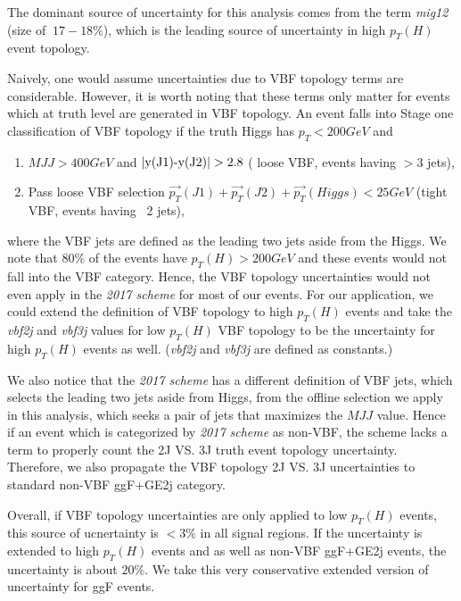 The dominant source of uncertainty for this analysis comes from the term \textit{mig12} (size of $~17-18\%$), 
which is the leading source of uncertainty in high $p_T(H)$ event topology. 

Naively, one would assume uncertainties due to VBF topology terms are considerable. 
However, it is worth noting that these terms only matter for events which 
at truth level are generated in VBF topology. An event falls into Stage one classification 
of VBF topology if the truth Higgs has $p_T<200GeV$ and 
\begin{enumerate}
\item $MJJ>400 GeV$ and $|\textnormal{y(J1)-y(J2)}|>2.8$ ( loose VBF, events having $>3$ jets),
\item Pass loose VBF selection $\overrightarrow{p_{T}}(J1)+\overrightarrow{p_{T}}(J2)+\overrightarrow{p_{T}}(Higgs)<25GeV$ (tight VBF, events having ~2 jets),
\end{enumerate}
where the VBF jets are defined as the leading two jets aside from the Higgs. We note that $80\%$ of the events have $p_T(H)>200GeV$ and 
these events would not fall into the VBF category. Hence, the VBF topology uncertainties would not even apply in the \textit{2017 scheme} for most of our events. 
For our application, we could extend the definition of VBF topology to high $p_T(H)$ events and take the \textit{vbf2j} and \textit{vbf3j} values
for low $p_T(H)$ VBF topology to be the uncertainty for high $p_T(H)$ events as well. (\textit{vbf2j} and \textit{vbf3j} are defined as constants.)

We also notice that the \textit{2017 scheme} has a different definition of VBF jets, which selects the leading two jets aside from Higgs,  from the 
offline selection we apply in this analysis, which seeks a pair of jets that maximizes the $MJJ$ value. Hence if an event which is categorized by \textit{2017 scheme}
as non-VBF, the scheme lacks a term to properly count the 2J VS. 3J truth event topology uncertainty. Therefore, we also propagate the VBF topology 2J VS. 3J
uncertainties to standard non-VBF ggF+GE2j category. 

Overall, if VBF topology uncertainties are only applied to low $p_T(H)$ events, this source 
of ucnertainty is $<3\%$ in all signal regions. If the uncertainty is extended to high $p_T(H)$ events and as well as non-VBF ggF+GE2j events, the uncertainty
is about $20\%$. We take this very conservative extended version of uncertainty for ggF events.



